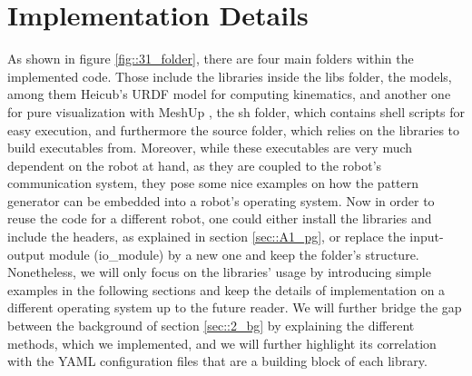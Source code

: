 \section{Implementation Details}
\label{sec::31_cs}
As shown in figure \ref{fig::31_folder}, there are four main folders within the implemented code. Those include the libraries inside the libs folder, the models, among them Heicub's URDF model for computing kinematics, and another one for pure visualization with MeshUp \cite{meshup}, the sh folder, which contains shell scripts for easy execution, and furthermore the source folder, which relies on the libraries to build executables from. Moreover, while these executables are very much dependent on the robot at hand, as they are coupled to the robot's communication system, they pose some nice examples on how the pattern generator can be embedded into a robot's operating system. Now in order to reuse the code for a different robot, one could either install the libraries and include the headers, as explained in section \ref{sec::A1_pg}, or replace the input-output module (io\_module) by a new one and keep the folder's structure. Nonetheless, we will only focus on the libraries' usage by introducing simple examples in the following sections and keep the details of implementation on a different operating system up to the future reader. We will further bridge the gap between the background of section \ref{sec::2_bg} by explaining the different methods, which we implemented, and we will further highlight its correlation with the YAML \cite{ben2005yaml} configuration files that are a building block of each library. 
